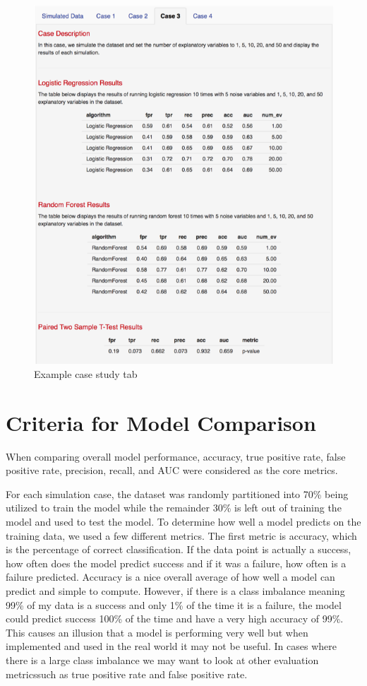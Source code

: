 \documentclass{llncs}
\begin{document}
\begin{figure}
\centering
\includegraphics[scale=0.75]{center.png}
\caption{Example case study tab}
\label{fig:center}
\end{figure}


\section{Criteria for Model Comparison}
\noindent 
When comparing overall model performance, accuracy, true positive rate, false positive rate, precision, recall, and AUC were considered as the core metrics.

For each simulation case, the dataset was randomly partitioned into 70\% being utilized to train the model while the remainder 30\% is left out of training the model and used to test the model. To determine how well a model predicts on the training data, we used a few different metrics. The first metric is accuracy, which is the percentage of correct classification. If the data point is actually a success, how often does the model predict success and if it was a failure, how often is a failure predicted. Accuracy is a nice overall average of how well a model can predict and simple to compute.  However, if there is a class imbalance meaning 99\% of my data is a success and only 1\% of the time it is a failure, the model could predict success 100\% of the time and have a very high accuracy of 99\%.  This causes an illusion that a model is performing very well but when implemented and used in the real world it may not be useful. In cases where there is a large class imbalance we may want to look at other evaluation metricssuch as true positive rate and false positive rate.  
\end{document}
